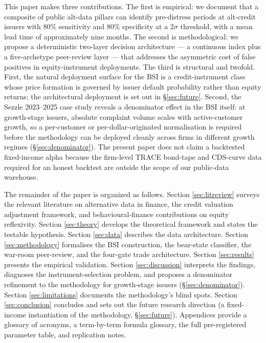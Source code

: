 \documentclass[11pt,a4paper]{article}
\begin{document}
This paper makes three contributions. The first is empirical: we document that a composite of public alt-data pillars can identify pre-distress periods at alt-credit issuers with 80\% sensitivity and 80\% specificity at a $2\sigma$ threshold, with a mean lead time of approximately nine months. The second is methodological: we propose a deterministic two-layer decision architecture --- a continuous index plus a five-archetype peer-review layer --- that addresses the asymmetric cost of false positives in equity-instrument deployments. The third is structural and twofold. First, the natural deployment surface for the BSI is a credit-instrument class whose price formation is governed by issuer default probability rather than equity returns; the architectural deployment is set out in §\ref{sec:future}. Second, the Sezzle 2023--2025 case study reveals a denominator effect in the BSI itself: at growth-stage issuers, absolute complaint volume scales with active-customer growth, so a per-customer or per-dollar-originated normalisation is required before the methodology can be deployed cleanly across firms in different growth regimes (§\ref{sec:denominator}). The present paper does not claim a backtested fixed-income alpha because the firm-level TRACE bond-tape and CDS-curve data required for an honest backtest are outside the scope of our public-data warehouse.

The remainder of the paper is organized as follows. Section \ref{sec:litreview} surveys the relevant literature on alternative data in finance, the credit valuation adjustment framework, and behavioural-finance contributions on equity reflexivity. Section \ref{sec:theory} develops the theoretical framework and states the testable hypothesis. Section \ref{sec:data} describes the data architecture. Section \ref{sec:methodology} formalises the BSI construction, the bear-state classifier, the war-room peer-review, and the four-gate trade architecture. Section \ref{sec:results} presents the empirical validation. Section \ref{sec:discussion} interprets the findings, diagnoses the instrument-selection problem, and proposes a denominator refinement to the methodology for growth-stage issuers (§\ref{sec:denominator}). Section \ref{sec:limitations} documents the methodology's blind spots. Section \ref{sec:conclusion} concludes and sets out the future research direction (a fixed-income instantiation of the methodology, §\ref{sec:future}). Appendices provide a glossary of acronyms, a term-by-term formula glossary, the full pre-registered parameter table, and replication notes.
\end{document}
